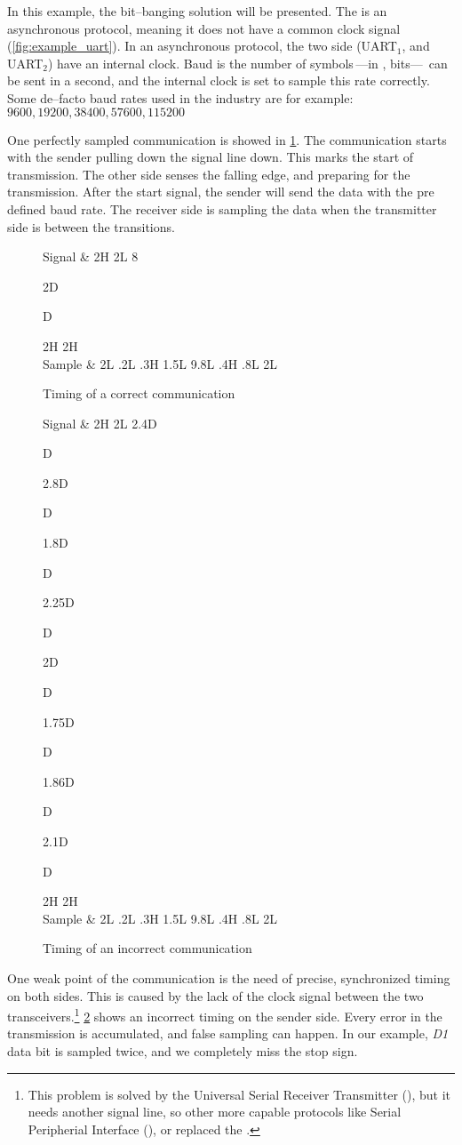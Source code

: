 In this example, the \uart bit--banging solution will be presented. The \uart is an asynchronous protocol, meaning it does not have a common clock signal (\cref{fig:example_uart}). In an asynchronous protocol, the two side (UART$_1$, and UART$_2$) have an internal clock. Baud is the number of symbols\,---in \uart, bits---\, can be sent in a second, and the internal clock is set to sample this rate correctly. Some de--facto baud rates used in the industry are for example: $9600, 19200, 38400, 57600, 115200$

One perfectly sampled \uart communication is showed in \cref{fig:uart_correct}. The communication starts with the sender pulling down the signal line down. This marks the start of transmission. The other side senses the falling edge, and preparing for the transmission. After the start signal, the sender will send the data with the pre defined baud rate. The receiver side is sampling the data when the transmitter side is between the transitions.

\setcounter{countup}{-1}
\newcommand*{\countup}{\addtocounter{countup}{1}\thecountup}

\begin{figure}[h]
	\centering
	\setcounter{countup}{-1}
	\begin{tikztimingtable}[yscale=2.0,timing/wscale=1.5]
		Signal								& 2H 2L 8{2D{D\countup}} 2H 2H \\
		Sample								& 2L {.2L .3H 1.5L} 9{.8L .4H .8L} 2L \\
	\end{tikztimingtable}
	\caption{Timing of a correct \uart communication}
	\label{fig:uart_correct}
\end{figure}

\begin{figure}[h]
	\centering
	\setcounter{countup}{-1}
	\begin{tikztimingtable}[yscale=2.0,timing/wscale=1.5]
		Signal								& 2H 2L 2.4D{D\countup} 2.8D{D\countup} 1.8D{D\countup} 2.25D{D\countup} 2D{D\countup} 1.75D{D\countup} 1.86D{D\countup} 2.1D{D\countup} 2H 2H \\
		Sample								& 2L {.2L .3H 1.5L} 9{.8L .4H .8L} 2L \\
	\end{tikztimingtable}
	\caption{Timing of an incorrect \uart communication}
	\label{fig:uart_incorrect}
\end{figure}

One weak point of the \uart communication is the need of precise, synchronized timing on both sides. This is caused by the lack of the clock signal between the two transceivers.\footnote{This problem is solved by the Universal Serial Receiver Transmitter (\usrt), but it needs another signal line, so other more capable protocols like Serial Peripherial Interface (\spi), or \isc replaced the \usrt.} \cref{fig:uart_incorrect} shows an incorrect timing on the sender side. Every error in the transmission is accumulated, and false sampling can happen. In our example, \emph{D1} data bit is sampled twice, and we completely miss the stop sign.
